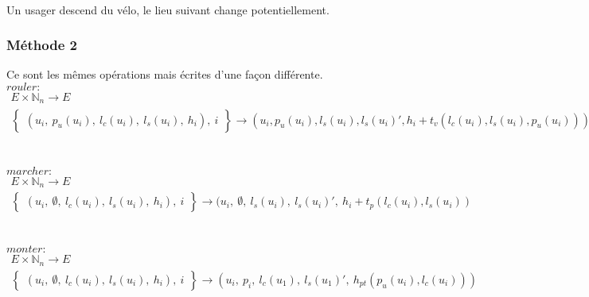 \documentclass[french]{article}
\begin{document}
\\
Un usager descend du vélo, le lieu suivant change potentiellement.
\vspace*{0.5cm}
\\

\subsubsection{Méthode 2}
Ce sont les mêmes opérations mais écrites d'une façon différente.\\


\noindent
$\displaystyle rouler:$
$\displaystyle \begin{matrix}
E\times \mathbb{N}_{n}\rightarrow E\\
\begin{Bmatrix}
( u_{i} ,\ p_{u}( u_{i}) ,\ l_{c}( u_{i}) ,\ l_{s}( u_{i}) ,\ h_{i}) ,\ i
\end{Bmatrix}\rightarrow ( u_{i} ,p_{u}( u_{i}) ,l_{s}( u_{i}) ,l_{s}( u_{i}) ',h_{i} +t_{v}( l_{c}( u_{i}) ,l_{s}( u_{i}),p_{u}( u_{i})))
\end{matrix}$\\
\\
\vspace*{0.5cm}
\\
$\displaystyle marcher:$
$\displaystyle \begin{matrix}
E\times \mathbb{N}_{n}\rightarrow E\\
\begin{Bmatrix}
( u_{i} ,\ \emptyset ,\ l_{c}( u_{i}) ,\ l_{s}( u_{i}) ,\ h_{i}) ,\ i
\end{Bmatrix}\rightarrow ( u_{i} ,\ \emptyset ,\ l_{s}( u_{i}) ,\ l_{s}( u_{i}) ',\ h_{i} +t_{p}( l_{c}( u_{i}) ,l_{s}( u_{i}))
\end{matrix}$\\
\\
\vspace*{0.5cm}
\\
$\displaystyle monter:$
$\displaystyle \begin{matrix}
E\times \mathbb{N}_{n}\rightarrow E\\
\begin{Bmatrix}
( u_{i} ,\ \emptyset ,\ l_{c}( u_{i}) ,\ l_{s}( u_{i}) ,\ h_{i}) ,\ i
\end{Bmatrix}\rightarrow ( u_{i} ,\ p_{i} ,\ l_{c}( u_{1}) ,\ l_{s}( u_{1}) ',\ h_{pt}( p_{u}( u_{i}) ,l_{c}( u_{i})))
\end{matrix}$\\
\\
\end{document}
